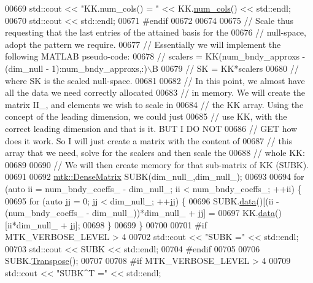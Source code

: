 \begin{DoxyCode}
{{00669   std::cout << \textcolor{stringliteral}{"KK.num\_cols() = "} << KK.\hyperlink{classmtk_1_1DenseMatrix_a41747502d468c6728a4be31501b16e0e}{num\_cols}() << std::endl;
00670   std::cout << std::endl;
00671 \textcolor{preprocessor}{  #endif}
00672 
00674 
00675   \textcolor{comment}{// Scale thus requesting that the last entries of the attained basis for the}
00676   \textcolor{comment}{// null-space, adopt the pattern we require.}
00677   \textcolor{comment}{// Essentially we will implement the following MATLAB pseudo-code:}
00678   \textcolor{comment}{//  scalers = KK(num\_bndy\_approxs - (dim\_null - 1):num\_bndy\_approxs,:)\(\backslash\)B}
00679   \textcolor{comment}{//  SK = KK*scalers}
00680   \textcolor{comment}{// where SK is the scaled null-space.}
00681 
00682   \textcolor{comment}{// In this point, we almost have all the data we need correctly allocated}
00683   \textcolor{comment}{// in memory. We will create the matrix II\_, and elements we wish to scale in}
00684   \textcolor{comment}{// the KK array. Using the concept of the leading dimension, we could just}
00685   \textcolor{comment}{// use KK, with the correct leading dimension and that is it. BUT I DO NOT}
00686   \textcolor{comment}{// GET how does it work. So I will just create a matrix with the content of}
00687   \textcolor{comment}{// this array that we need, solve for the scalers and then scale the}
00688   \textcolor{comment}{// whole KK:}
00689 
00690   \textcolor{comment}{// We will then create memory for that sub-matrix of KK (SUBK).}
00691 
00692   \hyperlink{classmtk_1_1DenseMatrix}{mtk::DenseMatrix} SUBK(dim\_null\_,dim\_null\_);
00693 
00694   \textcolor{keywordflow}{for} (\textcolor{keyword}{auto} ii = num\_bndy\_coeffs\_ - dim\_null\_; ii < num\_bndy\_coeffs\_; ++ii) \{
00695     \textcolor{keywordflow}{for} (\textcolor{keyword}{auto} jj = 0; jj < dim\_null\_; ++jj) \{
00696       SUBK.\hyperlink{classmtk_1_1DenseMatrix_a0c33b8a9e01d157c61ddbdf807c25d84}{data}()[(ii - (num\_bndy\_coeffs\_ - dim\_null\_))*dim\_null\_ + jj] =
00697           KK.\hyperlink{classmtk_1_1DenseMatrix_a0c33b8a9e01d157c61ddbdf807c25d84}{data}()[ii*dim\_null\_ + jj];
00698     \}
00699   \}
00700 
00701 \textcolor{preprocessor}{  #if MTK\_VERBOSE\_LEVEL > 4}
00702   std::cout << \textcolor{stringliteral}{"SUBK ="} << std::endl;
00703   std::cout << SUBK << std::endl;
00704 \textcolor{preprocessor}{  #endif}
00705 
00706   SUBK.\hyperlink{classmtk_1_1DenseMatrix_a71d9c07ca66e88d97d1fd5012f43138b}{Transpose}();
00707 
00708 \textcolor{preprocessor}{  #if MTK\_VERBOSE\_LEVEL > 4}
00709   std::cout << \textcolor{stringliteral}{"SUBK^T ="} << std::endl;
}}
\end{DoxyCode}
